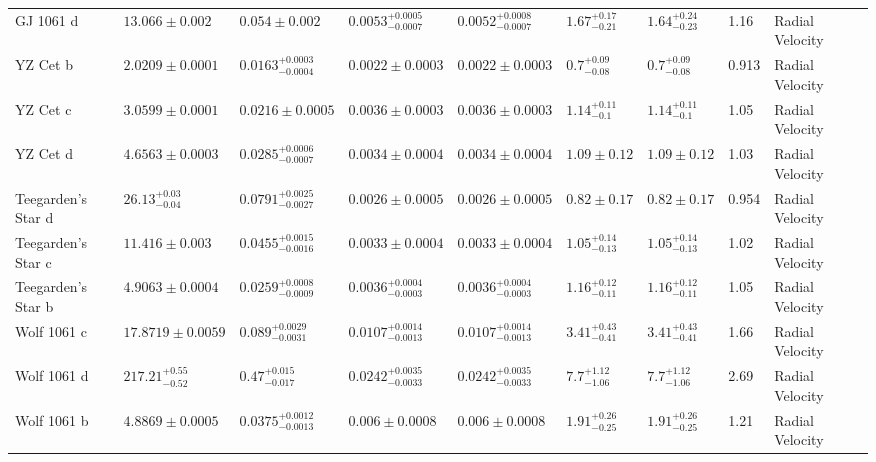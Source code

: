 \begin{tabular}{llllllllll}
GJ 1061 d & $13.066 \pm 0.002$ & $0.054 \pm 0.002$ & $0.0053^{+0.0005}_{-0.0007}$ & $0.0052^{+0.0008}_{-0.0007}$ & $1.67^{+0.17}_{-0.21}$ & $1.64^{+0.24}_{-0.23}$ & 1.16 & Radial Velocity & \cite{DREIZLER_ET_AL_2025} \\
YZ Cet b & $2.0209 \pm 0.0001$ & $0.0163^{+0.0003}_{-0.0004}$ & $0.0022 \pm 0.0003$ & $0.0022 \pm 0.0003$ & $0.7^{+0.09}_{-0.08}$ & $0.7^{+0.09}_{-0.08}$ & 0.913 & Radial Velocity & \cite{STOCK_ET_AL__2020} \\
YZ Cet c & $3.0599 \pm 0.0001$ & $0.0216 \pm 0.0005$ & $0.0036 \pm 0.0003$ & $0.0036 \pm 0.0003$ & $1.14^{+0.11}_{-0.1}$ & $1.14^{+0.11}_{-0.1}$ & 1.05 & Radial Velocity & \cite{STOCK_ET_AL__2020} \\
YZ Cet d & $4.6563 \pm 0.0003$ & $0.0285^{+0.0006}_{-0.0007}$ & $0.0034 \pm 0.0004$ & $0.0034 \pm 0.0004$ & $1.09 \pm 0.12$ & $1.09 \pm 0.12$ & 1.03 & Radial Velocity & \cite{STOCK_ET_AL__2020} \\
Teegarden's Star d & $26.13^{+0.03}_{-0.04}$ & $0.0791^{+0.0025}_{-0.0027}$ & $0.0026 \pm 0.0005$ & $0.0026 \pm 0.0005$ & $0.82 \pm 0.17$ & $0.82 \pm 0.17$ & 0.954 & Radial Velocity & \cite{DREIZLER_ET_AL_2024} \\
Teegarden's Star c & $11.416 \pm 0.003$ & $0.0455^{+0.0015}_{-0.0016}$ & $0.0033 \pm 0.0004$ & $0.0033 \pm 0.0004$ & $1.05^{+0.14}_{-0.13}$ & $1.05^{+0.14}_{-0.13}$ & 1.02 & Radial Velocity & \cite{DREIZLER_ET_AL_2024} \\
Teegarden's Star b & $4.9063 \pm 0.0004$ & $0.0259^{+0.0008}_{-0.0009}$ & $0.0036^{+0.0004}_{-0.0003}$ & $0.0036^{+0.0004}_{-0.0003}$ & $1.16^{+0.12}_{-0.11}$ & $1.16^{+0.12}_{-0.11}$ & 1.05 & Radial Velocity & \cite{DREIZLER_ET_AL_2024} \\
Wolf 1061 c & $17.8719 \pm 0.0059$ & $0.089^{+0.0029}_{-0.0031}$ & $0.0107^{+0.0014}_{-0.0013}$ & $0.0107^{+0.0014}_{-0.0013}$ & $3.41^{+0.43}_{-0.41}$ & $3.41^{+0.43}_{-0.41}$ & 1.66 & Radial Velocity & \cite{ASTUDILLO_DEFRU_ET_AL__2017} \\
Wolf 1061 d & $217.21^{+0.55}_{-0.52}$ & $0.47^{+0.015}_{-0.017}$ & $0.0242^{+0.0035}_{-0.0033}$ & $0.0242^{+0.0035}_{-0.0033}$ & $7.7^{+1.12}_{-1.06}$ & $7.7^{+1.12}_{-1.06}$ & 2.69 & Radial Velocity & \cite{ASTUDILLO_DEFRU_ET_AL__2017} \\
Wolf 1061 b & $4.8869 \pm 0.0005$ & $0.0375^{+0.0012}_{-0.0013}$ & $0.006 \pm 0.0008$ & $0.006 \pm 0.0008$ & $1.91^{+0.26}_{-0.25}$ & $1.91^{+0.26}_{-0.25}$ & 1.21 & Radial Velocity & \cite{ASTUDILLO_DEFRU_ET_AL__2017} \\

\end{tabular}
